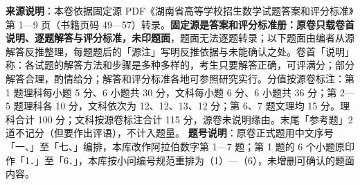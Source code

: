 


\begin{gktip}
\textbf{来源说明}：本卷依据固定源 PDF《湖南省高等学校招生数学试题答案和评分标准》第 1—9 页（书籍页码 49—57）转录。\textbf{固定源是答案和评分标准册：原卷只载卷首说明、逐题解答与评分标准，未印题面}，题面无法逐题转录；以下题面由编者从源解答反推整理，每题题后的「源注」写明反推依据与未能确认之处。卷首「说明」称：各试题的解答方法和步骤是多种多样的，考生只要解答正确，可评满分；部分解答合理，酌情给分；解答和评分标准各地可参照研究实行。分值按源卷标注：第 1 题理科每小题 5 分、6 小题共 30 分，文科每小题 6 分、6 小题共 36 分；第 2—5 题理科各 10 分，文科依次为 12、12、13、12 分；第 6、7 题文理均 15 分。理科合计 100 分；文科按源卷标注合计 115 分，源卷未说明缘由。末尾「参考题」2 道不记分（但要作出评语），不计入题量。
\textbf{题号说明}：原卷正式题用中文序号「一、」至「七、」编排，本库改作阿拉伯数字第 1—7 题；第 1 题的 6 个小题原印作「1．」至「6．」，本库按小问编号规范重排为（1）—（6），未增删可确认的题面内容。
\end{gktip}

\par\medskip

